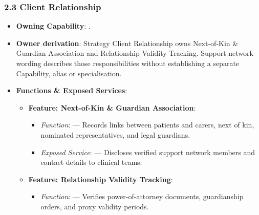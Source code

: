 \par\smallskip
{}\label{rad:em:54}
\subsubsection*{2.3 Client Relationship}
\label{rad:em:55}

\begin{itemize}

\item
\textbf{Owning Capability}: \texttt{}.



\item
\textbf{Owner derivation}: Strategy Client Relationship owns Next-of-Kin \& Guardian Association and Relationship Validity Tracking. Support-network wording describes those responsibilities without establishing a separate Capability, alias or specialisation.



\item
\textbf{Functions \& Exposed Services}:


\begin{itemize}

\item
\textbf{Feature: Next-of-Kin \& Guardian Association}:


\begin{itemize}

\item
\emph{Function}: \texttt{} — Records links between patients and carers, next of kin, nominated representatives, and legal guardians.



\item
\emph{Exposed Service}: \texttt{} — Discloses verified support network members and contact details to clinical teams.



\end{itemize}


\item
\textbf{Feature: Relationship Validity Tracking}:


\begin{itemize}

\item
\emph{Function}: \texttt{} — Verifies power-of-attorney documents, guardianship orders, and proxy validity periods.




\end{itemize}
\end{itemize}
\end{itemize}
